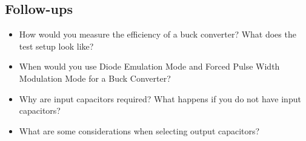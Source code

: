 \documentclass[main.tex]{subfiles}
\begin{document}
\subsection{Follow-ups}
\begin{itemize}
    \item How would you measure the efficiency of a buck converter? What does the test setup look like? %
    \item When would you use Diode Emulation Mode and Forced Pulse Width Modulation Mode for a Buck Converter?  %
    \item Why are input capacitors required? What happens if you do not have input capacitors? %
    \item What are some considerations when selecting output capacitors? %
\end{itemize}
\end{document}
